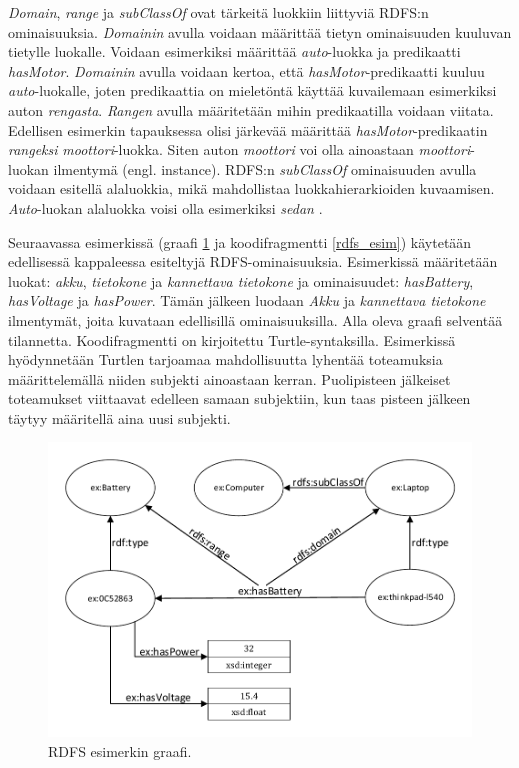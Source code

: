 \documentclass[finnish, 12pt, a4paper, elec, utf8, pdfa, online]{aaltothesis}
\begin{document}
{\textit{Domain}, \textit{range} ja \textit{subClassOf} ovat tärkeitä luokkiin liittyviä RDFS:n ominaisuuksia. \textit{Domainin} avulla voidaan määrittää tietyn ominaisuuden kuuluvan tietylle luokalle. Voidaan esimerkiksi määrittää \textit{auto}-luokka ja predikaatti \textit{hasMotor}. \textit{Domainin} avulla voidaan kertoa, että \textit{hasMotor}-predikaatti kuuluu \textit{auto}-luokalle, joten predikaattia on mieletöntä käyttää kuvailemaan esimerkiksi auton \textit{rengasta}. \textit{Rangen} avulla määritetään mihin predikaatilla voidaan viitata. Edellisen esimerkin tapauksessa olisi järkevää määrittää \textit{hasMotor}-predikaatin \textit{rangeksi} \textit{moottori}-luokka. Siten auton \textit{moottori} voi olla ainoastaan \textit{moottori}-luokan ilmentymä (engl. instance). RDFS:n \textit{subClassOf} ominaisuuden avulla voidaan esitellä alaluokkia, mikä mahdollistaa luokkahierarkioiden kuvaamisen. \textit{Auto}-luokan alaluokka voisi olla esimerkiksi \textit{sedan}
\cite{W3C_RDFS2}.

Seuraavassa esimerkissä (graafi \ref{images/laptop} ja koodifragmentti \ref{rdfs_esim}) käytetään edellisessä kappaleessa esiteltyjä RDFS-ominaisuuksia. Esimerkissä määritetään luokat: \textit{akku}, \textit{tietokone} ja \textit{kannettava tietokone} ja ominaisuudet: \textit{hasBattery}, \textit{hasVoltage} ja \textit{hasPower}. Tämän jälkeen luodaan \textit{Akku} ja \textit{kannettava tietokone} ilmentymät, joita kuvataan edellisillä ominaisuuksilla. Alla oleva graafi selventää tilannetta. Koodifragmentti on kirjoitettu Turtle-syntaksilla. Esimerkissä hyödynnetään Turtlen tarjoamaa mahdollisuutta lyhentää toteamuksia määrittelemällä niiden subjekti ainoastaan kerran. Puolipisteen jälkeiset toteamukset viittaavat edelleen samaan subjektiin, kun taas pisteen jälkeen täytyy määritellä aina uusi subjekti.

\begin{figure}[htb]
\centering
\includegraphics[width=13cm]{images/laptop.pdf}
\vspace{-0.75cm}
\caption{RDFS esimerkin graafi.}
\label{images/laptop}
\end{figure}

}
\end{document}

